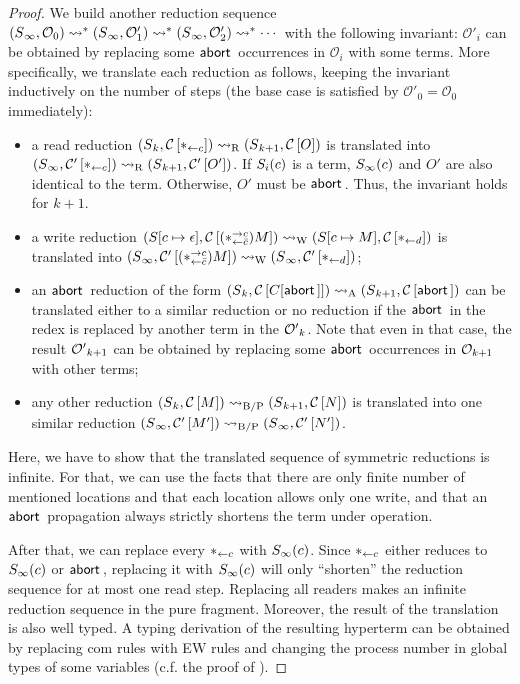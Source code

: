 \begin{proof}
We build another reduction sequence
$
({S}{_\infty},{\mathcal{O}_0})
\rightsquigarrow^\ast
({S}{_\infty},{\mathcal{O}'_1})
\rightsquigarrow^\ast
({S}{_\infty},{\mathcal{O}'_2})
\rightsquigarrow^\ast\cdots
$
with the following invariant:
$\mathcal O'_i$ can be obtained by replacing some $\mathsf{abort\,}$ occurrences
in $\mathcal O_i$ with some terms.
More specifically, we translate each reduction as follows, keeping the
invariant inductively on the number of steps
(the base case is satisfied by $\mathcal O'_0 = \mathcal O_0$ immediately):
\begin{itemize}
 \item a read reduction $({S}{_k},{{\mathcal{C}}\left[{\ast_{\leftarrow{c}}}\right]})
       \rightsquigarrow_{\mathrm R}
       ({S}{_{k+1}},{{\mathcal{C}}\left[{O}\right]})$ is translated into
       $({S}{_\infty},{{\mathcal{C}'}\left[{\ast_{\leftarrow{c}}}\right]}) \rightsquigarrow_{\mathrm R}
       ({S}{_{k+1}},{{\mathcal{C}'}\left[{O'}\right]})$.
       If ${S}_i(c)$ is a term,
       ${S}_\infty(c)$ and $O'$ are also identical to the term.
       Otherwise, $O'$ must be $\mathsf{abort\,}$.
       Thus, the invariant
       holds for $k+1$.
 \item a write reduction $({S}{[c\mapsto \epsilon]},{{\mathcal{C}}\left[{(\ast^{\rightarrow {c}}_{\leftarrow{\bar{c}}})M}\right]}) \rightsquigarrow_{\mathrm W}
	({S}{[c\mapsto M]},{{\mathcal{C}}\left[{\ast_{\leftarrow{d}}}\right]})
	$ is translated into
       $({S}{_\infty},{{\mathcal{C}'}\left[{(\ast^{\rightarrow {c}}_{\leftarrow{\bar{c}}})M}\right]}) \rightsquigarrow_{\mathrm W}
	({S}{_\infty},{{\mathcal{C}'}\left[{\ast_{\leftarrow{d}}}\right]})
	$;
 \item an $\mathsf{abort\,}$ reduction of the form
       $({S}{_k},{{\mathcal{C}}\left[{C[\mathsf{abort\,}]}\right]}) \rightsquigarrow_{\mathrm A}
       ({S}{_{k+1}},{{\mathcal{C}}\left[{\mathsf{abort\,}}\right]})$ can be translated
       either to a similar reduction or no reduction if the $\mathsf{abort\,}$ in
       the redex is replaced by another term in the ${\mathcal{O}'}_k$.
       Note that even in that case, the result ${\mathcal{O}'}_{k+1}$ can
       be obtained by replacing some $\mathsf{abort\,}$ occurrences in
       $\mathcal{O}_{k+1}$ with other terms;
 \item any other reduction $({S}{_k},{{\mathcal{C}}\left[{M}\right]}) \rightsquigarrow_{\mathrm{B/P}}
       ({S}{_{k+1}},{{\mathcal{C}}\left[{N}\right]})$
       is translated into one similar reduction
       $({S}{_\infty},{{\mathcal{C}'}\left[{M'}\right]})\rightsquigarrow_{\mathrm{B/P}}
        ({S}{_\infty},{{\mathcal{C}'}\left[{N'}\right]})$.
\end{itemize}
Here, we have to show that the translated sequence of symmetric
reductions is infinite.
For that, we can use the facts that there are only finite
number of mentioned locations and that each location allows only one
 write, and that an $\mathsf{abort\,}$ propagation always
strictly shortens the term under operation.

 After that, we can replace
 every ${\ast_{\leftarrow{c}}}$ with
 ${S}_\infty(c)$.
 Since $\ast_{\leftarrow{c}}$ either reduces to ${S}_\infty(c)$ or $\mathsf{abort\,}$,
 replacing it with ${S}_\infty(c)$ will only ``shorten'' the reduction
 sequence for at most one read step.
 Replacing all readers
 makes an infinite reduction sequence in the pure fragment.
 Moreover,
 the result of the translation is also well typed.
 A typing derivation of the resulting hyperterm can be obtained by
 replacing com rules with EW rules and changing the process number in
 global types of some variables (c.f. the proof of ).


\end{proof}
